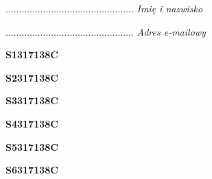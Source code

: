 \begin{turn}{90}\begin{minipage}{\linewidth} \vspace{20mm} ................................................  \textit{Imię i nazwisko}\end{minipage}\end{turn}

\begin{turn}{90}\begin{minipage}{\linewidth} \vspace{20mm} ................................................  \textit{Adres e-mailowy}\end{minipage}\end{turn}

\begin{turn}{90}\huge \begin{minipage}{\linewidth} \vspace{10mm}\textbf{S1317138C}\end{minipage}\end{turn}

\begin{turn}{90}\huge \begin{minipage}{\linewidth} \vspace{10mm}\textbf{S2317138C}\end{minipage}\end{turn}

\begin{turn}{90}\huge \begin{minipage}{\linewidth} \vspace{10mm}\textbf{S3317138C}\end{minipage}\end{turn}

\begin{turn}{90}\huge \begin{minipage}{\linewidth} \vspace{10mm}\textbf{S4317138C}\end{minipage}\end{turn}

\begin{turn}{90}\huge \begin{minipage}{\linewidth} \vspace{10mm}\textbf{S5317138C}\end{minipage}\end{turn}

\begin{turn}{90}\huge \begin{minipage}{\linewidth} \vspace{10mm}\textbf{S6317138C}\end{minipage}\end{turn}

